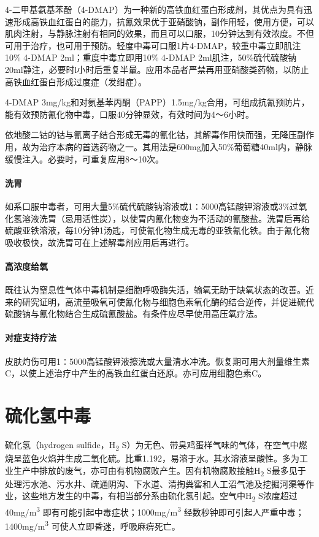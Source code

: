 4-二甲基氨基苯酚（4-DMAP）为一种新的高铁血红蛋白形成剂，其优点为具有迅速形成高铁血红蛋白的能力，抗氰效果优于亚硝酸钠，副作用轻，使用方便，可以肌肉注射，与静脉注射有相同的效果，而且可以口服，10分钟达到有效浓度。不但可用于治疗，也可用于预防。轻度中毒可口服1片4-DMAP，较重中毒立即肌注10\%
4-DMAP 2ml；重度中毒立即用10\% 4-DMAP
2ml肌注，50\%硫代硫酸钠20ml静注，必要时l小时后重复半量。应用本品者严禁再用亚硝酸类药物，以防止高铁血红蛋白形成过度症（发绀症）。

4-DMAP
3mg/kg和对氨基苯丙酮（PAPP）1.5mg/kg合用，可组成抗氰预防片，能有效预防氰化物中毒，口服40分钟显效，有效时间为4～6小时。

依地酸二钴的钴与氰离子结合形成无毒的氰化钴，其解毒作用快而强，无降压副作用，故为治疗本病的首选药物之一。其用法是600mg加入50\%葡萄糖40ml内，静脉缓慢注入。必要时，可重复应用8～10次。

\paragraph{洗胃}

如系口服中毒者，可用大量5\%硫代硫酸钠溶液或1∶5000高锰酸钾溶液或3\%过氧化氢溶液洗胃（忌用活性炭），以使胃内氰化物变为不活动的氰酸盐。洗胃后再给硫酸亚铁溶液，每10分钟1汤匙，可使氰化物生成无毒的亚铁氰化铁。由于氰化物吸收极快，故洗胃可在上述解毒剂应用后再进行。

\paragraph{高浓度给氧}

既往认为窒息性气体中毒机制是细胞呼吸酶失活，输氧无助于缺氧状态的改善。近来的研究证明，高流量吸氧可使氰化物与细胞色素氧化酶的结合逆传，并促进硫代硫酸钠与氰化物结合生成硫氰酸盐。有条件应尽早使用高压氧疗法。

\paragraph{对症支持疗法}

皮肤灼伤可用1∶5000高锰酸钾液擦洗或大量清水冲洗。恢复期可用大剂量维生素C，以使上述治疗中产生的高铁血红蛋白还原。亦可应用细胞色素C。

\protect\hypertarget{text00149.html}{}{}

\section{硫化氢中毒}

硫化氢（hydrogen sulfide，H\textsubscript{2}
S）为无色、带臭鸡蛋样气味的气体，在空气中燃烧呈蓝色火焰并生成二氧化硫。比重1.192，易溶于水。其水溶液呈酸性。多为工业生产中排放的废气，亦可由有机物腐败产生。因有机物腐败接触H\textsubscript{2}
S最多见于处理污水池、污水井、疏通阴沟、下水道、清掏粪窖和人工沼气池及挖掘河渠等作业，这些地方发生的中毒，有相当部分系由硫化氢引起。空气中H\textsubscript{2}
S浓度超过40mg/m\textsuperscript{3}
即有可能引起中毒症状；1000mg/m\textsuperscript{3}
经数秒钟即可引起人严重中毒；1400mg/m\textsuperscript{3}
可使人立即昏迷，呼吸麻痹死亡。

